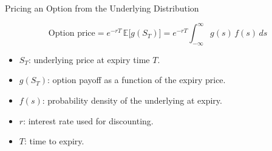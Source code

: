 \begin{frame}{Pricing an Option from the Underlying Distribution}
  \vspace{0.2cm}
  \begin{sqt:definition}
    \[
      \text{Option price}
      = e^{-rT}\,\mathbb{E}\big[g(S_T)\big]
      = e^{-rT}\int_{-\infty}^{\infty} g(s)\, f(s)\, ds
    \]
  \end{sqt:definition}

  \begin{itemize}
    \item $S_T$: underlying price at expiry time $T$.
    \item $g(S_T)$: option payoff as a function of the expiry price.
    \item $f(s)$: probability density of the underlying at expiry.
    \item $r$: interest rate used for discounting.
    \item $T$: time to expiry.
  \end{itemize}
\end{frame}

